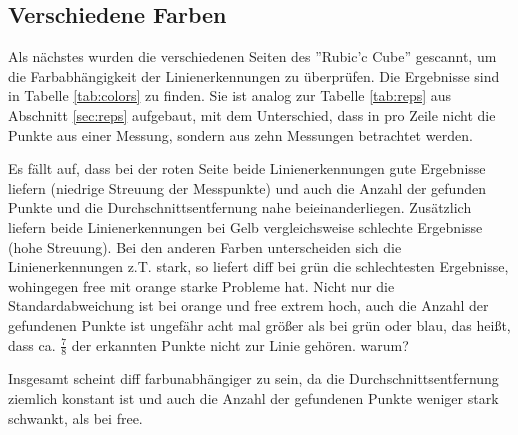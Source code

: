 \documentclass[ngerman,a4paper,parskip=half]{scrartcl}
\begin{document}
\subsection{Verschiedene Farben}

Als nächstes wurden die verschiedenen Seiten des ''Rubic'c Cube'' gescannt, um die Farbabhängigkeit der Linienerkennungen zu überprüfen. Die Ergebnisse sind in Tabelle \ref{tab:colors} zu finden. Sie ist analog zur Tabelle \ref{tab:reps} aus Abschnitt \ref{sec:reps} aufgebaut, mit dem Unterschied, dass in pro Zeile nicht die Punkte aus einer Messung, sondern aus zehn Messungen betrachtet werden.

Es fällt auf, dass bei der roten Seite beide Linienerkennungen gute Ergebnisse liefern (niedrige Streuung der Messpunkte) und auch die Anzahl der gefunden Punkte und die Durchschnittsentfernung nahe beieinanderliegen. Zusätzlich liefern beide Linienerkennungen bei Gelb vergleichsweise schlechte Ergebnisse (hohe Streuung). Bei den anderen Farben unterscheiden sich die Linienerkennungen z.T. stark, so liefert diff bei grün die schlechtesten Ergebnisse, wohingegen free mit orange starke Probleme hat. Nicht nur die Standardabweichung ist bei orange und free extrem hoch, auch die Anzahl der gefundenen Punkte ist ungefähr acht mal größer als bei grün oder blau, das heißt, dass ca. $\frac{7}{8}$ der erkannten Punkte nicht zur Linie gehören. {\color{red} warum?}

Insgesamt scheint diff farbunabhängiger zu sein, da die Durchschnittsentfernung ziemlich konstant ist und auch die Anzahl der gefundenen Punkte weniger stark schwankt, als bei free. 
\end{document}
